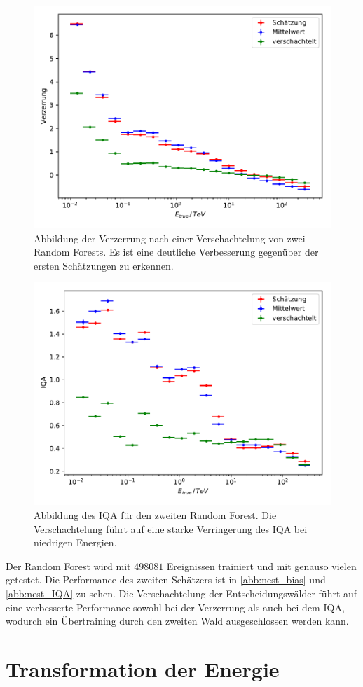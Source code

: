 \begin{figure}
  \includegraphics[width=\textwidth]{Plots/RF_nested_bias.pdf}
  \centering
  \caption{Abbildung der Verzerrung nach einer Verschachtelung von zwei Random Forests. Es ist eine deutliche Verbesserung gegenüber der ersten Schätzungen
            zu erkennen.}
  \label{abb:nest_bias}
\end{figure}
\begin{figure}
  \includegraphics[width=\textwidth]{Plots/RF_nested_resolution.pdf}
  \centering
  \caption{Abbildung des IQA für den zweiten Random Forest. Die Verschachtelung führt auf eine starke Verringerung des IQA bei niedrigen Energien.}
  \label{abb:nest_IQA}
\end{figure}
Der Random Forest wird mit $\num{498081}$ Ereignissen trainiert und mit genauso vielen getestet. Die Performance des zweiten Schätzers ist in \autoref{abb:nest_bias}
und \autoref{abb:nest_IQA} zu sehen.
Die Verschachtelung der Entscheidungswälder führt auf eine verbesserte Performance sowohl bei der Verzerrung als auch bei dem IQA, wodurch ein Übertraining
durch den zweiten Wald ausgeschlossen werden kann.

\section{Transformation der Energie}
